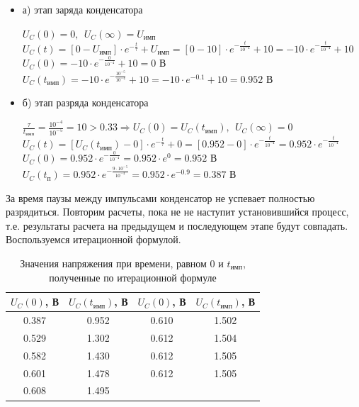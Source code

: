 \documentclass[a4paper,14pt]{extarticle}
\begin{document}
\begin{itemize}
\item[] а) этап заряда конденсатора

	$U_C(0) = 0,\ \ U_C(\infty) = U_\text{имп}$\\	
	$U_C(t) = [0 - U_\text{имп}] \cdot e^{-\frac{t}{\tau}} + U_\text{имп} = [0 - 10] \cdot e^{-\frac{t}{10^{-4}}} + 10 = -10 \cdot e^{-\frac{t}{10^{-4}}} + 10$\\
	$U_C(0) = -10 \cdot e^{-\frac{0}{10^{-4}}} + 10 = 0 \text{ В}$\\
	$U_C(t_\text{имп}) = -10 \cdot e^{-\frac{10^{-5}}{10^{-4}}} + 10 = -10 \cdot e^{-0.1} + 10 = 0.952 \text{ В}$
	
\item[] б) этап разряда конденсатора

	$\frac{\tau}{t_\text{имп}} = \frac{10^{-4}}{10^{-5}} = 10 > 0.33 \Rightarrow U_C(0) = U_C(t_\text{имп}),\ \ U_C(\infty) = 0$\\
	$U_C(t) = [U_C(t_\text{имп}) - 0] \cdot e^{-\frac{t}{\tau}} + 0 =  [0.952 - 0] \cdot e^{-\frac{t}{10^{-4}}} = 0.952 \cdot e^{-\frac{t}{10^{-4}}}$\\
	$U_C(0) = 0.952 \cdot e^{-\frac{0}{10^{-4}}} = 0.952 \cdot e^0 = 0.952 \text{ В}$\\
	$U_C(t_\text{п}) = 0.952 \cdot e^{-\frac{9 \cdot 10^{-5}}{10^{-4}}} = 0.952 \cdot e^{-0.9} = 0.387 \text{ В}$
\end{itemize}

За время паузы между импульсами конденсатор не успевает полностью разрядиться. Повторим расчеты, пока не не наступит установившийся процесс, т.е. результаты расчета на предыдущем и последующем этапе будут совпадать. Воспользуемся итерационной формулой.

\begin{table}[H]
\begin{center}
	\captionsetup{justification=centering,margin=1cm}
	\caption{Значения напряжения при времени, равном $0$ и $t_\text{имп}$, полученные по итерационной формуле}
	\def\arraystretch{1.3}
	\def\tabcolsep{25pt}
	\begin{tabular}{|c|c||c|c|}
		\hline 
		$U_C(0)$, В & $U_C(t_\text{имп})$, В & $U_C(0)$, В & $U_C(t_\text{имп})$, В \\ 
		\hline 
		0.387 & 0.952 & 0.610 & 1.502 \\
		\hline 
		0.529 & 1.302 & 0.612 & 1.504 \\
		\hline 
		0.582 & 1.430 & 0.612 & 1.505 \\ 
		\hline 
		0.601 & 1.478 & 0.612 & 1.505 \\
		\hline 
		0.608 & 1.495 & & \\
		\hline 
	\end{tabular}
\end{center}
\end{table}
\end{document}
